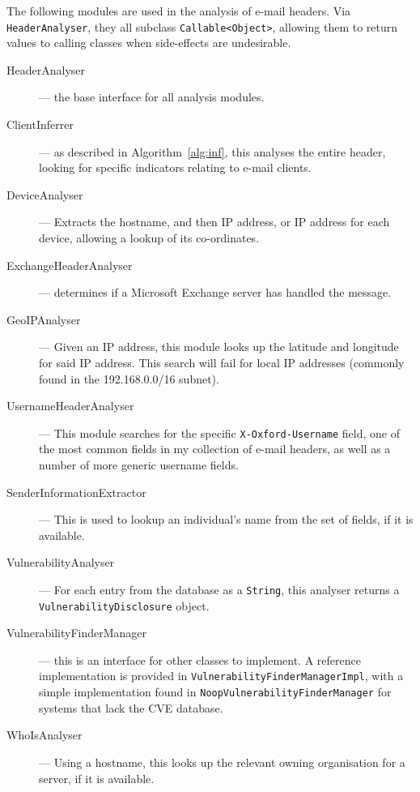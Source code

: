 The following modules are used in the analysis of e-mail headers. Via
\texttt{HeaderAnalyser}, they all subclass \texttt{Callable<Object>}, allowing
them to return values to calling classes when side-effects are undesirable.

\begin{description}
	\item[HeaderAnalyser] --- the base interface for all analysis modules.

	\item[ClientInferrer] --- as described in Algorithm~\ref{alg:inf}, this
		analyses the entire header, looking for specific indicators
		relating to e-mail clients.
		
	\item[DeviceAnalyser] --- Extracts the hostname, and then IP address, or
		IP address for each device, allowing a lookup of its
		co-ordinates.

	\item[ExchangeHeaderAnalyser] --- determines if a Microsoft Exchange
		server has handled the message.

	\item[GeoIPAnalyser] --- Given an IP address, this module looks up the
		latitude and longitude for said IP address.  This search will
		fail for local IP addresses (commonly found in the
		192.168.0.0/16 subnet).

	\item[UsernameHeaderAnalyser] --- This module searches for the specific
		\texttt{X-Oxford-Username} field, one of the most common fields
		in my collection of e-mail headers, as well as a number of more
		generic username fields.

	\item[SenderInformationExtractor] --- This is used to lookup an
		individual's name from the set of fields, if it is available.

	\item[VulnerabilityAnalyser] --- For each entry from the database as a
		\texttt{String}, this analyser returns a
		\texttt{VulnerabilityDisclosure} object.

	\item[VulnerabilityFinderManager] --- this is an interface for other
		classes to implement. A reference implementation is provided in
		\texttt{VulnerabilityFinderManagerImpl}, with a simple
		implementation found in \texttt{NoopVulnerabilityFinderManager}
		for systems that lack the CVE database.

	\item[WhoIsAnalyser] --- Using a hostname, this looks up the relevant
		owning organisation for a server, if it is available.
		
\end{description}

